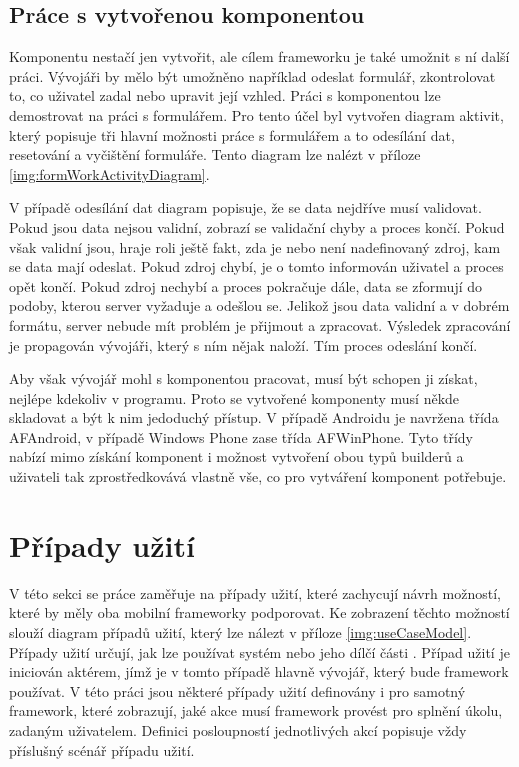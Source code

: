 \subsection{Práce s vytvořenou komponentou}
Komponentu nestačí jen vytvořit, ale cílem frameworku je také umožnit s ní další práci. Vývojáři by mělo být umožněno například odeslat formulář, zkontrolovat to, co uživatel zadal nebo upravit její vzhled. Práci s komponentou lze demostrovat na práci s formulářem. Pro tento účel byl vytvořen diagram aktivit, který popisuje tři hlavní možnosti práce s formulářem a to odesílání dat, resetování a vyčištění formuláře. Tento diagram lze nalézt v příloze \ref{img:formWorkActivityDiagram}.

V případě odesílání dat diagram popisuje, že se data nejdříve musí validovat. Pokud jsou data nejsou validní, zobrazí se validační chyby a proces končí. Pokud však validní jsou, hraje roli ještě fakt, zda je nebo není nadefinovaný zdroj, kam se data mají odeslat. Pokud zdroj chybí, je o tomto informován uživatel a proces opět končí. Pokud zdroj nechybí a proces pokračuje dále, data se zformují do podoby, kterou server vyžaduje a odešlou se. Jelikož jsou data validní a v dobrém formátu, server nebude mít problém je přijmout a zpracovat. Výsledek zpracování je propagován vývojáři, který s ním nějak naloží. Tím proces odeslání končí. 

Aby však vývojář mohl s komponentou pracovat, musí být schopen ji získat, nejlépe kdekoliv v programu. Proto se vytvořené komponenty musí někde skladovat a být k nim jedoduchý přístup. V případě Androidu je navržena třída AFAndroid, v případě Windows Phone zase třída AFWinPhone. Tyto třídy nabízí mimo získání komponent i možnost vytvoření obou typů builderů a uživateli tak zprostředkovává vlastně vše, co pro vytváření komponent potřebuje.

\section{Případy užití}
V této sekci se práce zaměřuje na případy užití, které zachycují návrh možností, které by měly oba mobilní frameworky podporovat. Ke zobrazení těchto možností slouží diagram případů užití, který lze nálezt v příloze \ref{img:useCaseModel}. Případy užití určují, jak lze používat systém nebo jeho dílčí části \cite{UmlArlow}. Případ užití je iniciován aktérem, jímž je v tomto případě hlavně vývojář, který bude framework používat. V této práci jsou některé případy užití definovány i pro samotný framework, které zobrazují, jaké akce musí framework provést pro splnění úkolu, zadaným uživatelem. Definici posloupností jednotlivých akcí popisuje vždy příslušný scénář případu užití. 

